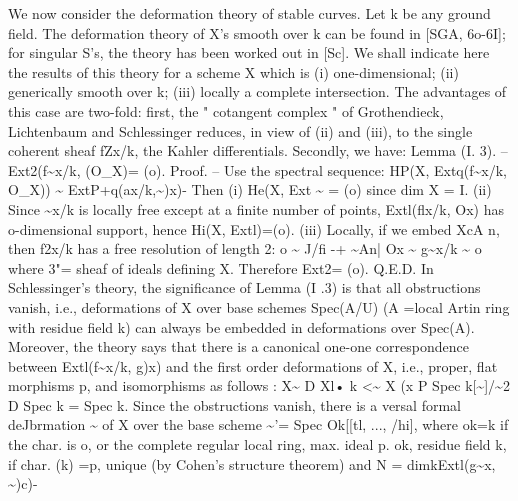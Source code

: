 \documentclass[11pt]{article}
\theoremstyle{plain}
\theoremstyle{definition}
\theoremstyle{remark}
\begin{document}
We now consider the deformation theory of stable curves. Let k be any ground field. The deformation theory of X's smooth over k can be found in [SGA, 6o-6I]; for singular S's, the theory has been worked out in [Sc]. We shall indicate here the results of this theory for a scheme X which is (i) one-dimensional; (ii) generically smooth over k; (iii) locally a complete intersection. The advantages of this case are two-fold: first, the " cotangent complex " of Grothendieck, Lichtenbaum and Schlessinger reduces, in view of (ii) and (iii), to the single coherent sheaf fZx/k, the Kahler differentials. Secondly, we have: Lemma (I. 3). -- Ext2(f\textasciitilde{}x/k, (O\_X)= (o). Proof. -- Use the spectral sequence: HP(X, Extq(f\textasciitilde{}x/k, O\_X)) \textasciitilde{} ExtP+q(ax/k,\textasciitilde{})x)- Then (i) He(X, Ext \textasciitilde{} = (o) since dim X = I. (ii) Since \textasciitilde{}x/k is locally free except at a finite number of points, Extl(flx/k, Ox) has o-dimensional support, hence Hi(X, Extl)=(o). (iii) Locally, if we embed XcA n, then f2x/k has a free resolution of length 2: o \textasciitilde{} J/fi -+ \textasciitilde{}An| Ox \textasciitilde{} g\textasciitilde{}x/k \textasciitilde{} o where 3"= sheaf of ideals defining X. Therefore Ext2= (o). Q.E.D. In Schlessinger's theory, the significance of Lemma (I .3) is that all obstructions vanish, i.e., deformations of X over base schemes Spec(A/U) (A =local Artin ring with residue field k) can always be embedded in deformations over Spec(A). Moreover, the theory says that there is a canonical one-one correspondence between Extl(f\textasciitilde{}x/k, g)x) and the first order deformations of X, i.e., proper, flat morphisms p, and isomorphisms as follows : X\textasciitilde{} D Xl• k <\textasciitilde{} X (x P Spec k[\textasciitilde{}]/\textasciitilde{}2 D Spec k = Spec k. Since the obstructions vanish, there is a versal formal deJbrmation \textasciitilde{} of X over the base scheme \textasciitilde{}'= Spec Ok[[tl, ..., /hi], where ok=k if the char. is o, or the complete regular local ring, max. ideal p. ok, residue field k, if char. (k) =p, unique (by Cohen's structure theorem) and N = dimkExtl(g\textasciitilde{}x, \textasciitilde{})c)-
\end{document}
